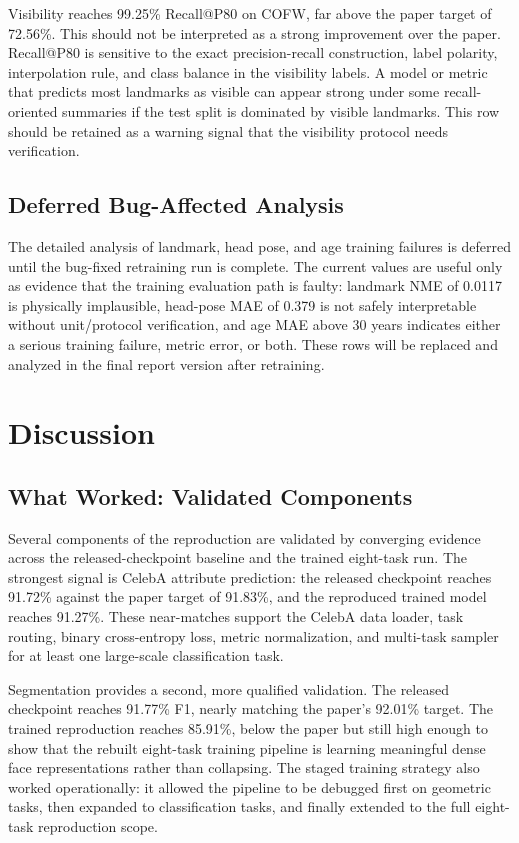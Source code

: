 \documentclass[11pt]{article}
\begin{document}
Visibility reaches 99.25\% Recall@P80 on COFW, far above the paper target of 72.56\%. This should not be interpreted as a strong improvement over the paper. Recall@P80 is sensitive to the exact precision-recall construction, label polarity, interpolation rule, and class balance in the visibility labels. A model or metric that predicts most landmarks as visible can appear strong under some recall-oriented summaries if the test split is dominated by visible landmarks. This row should be retained as a warning signal that the visibility protocol needs verification.


\subsection{Deferred Bug-Affected Analysis}


The detailed analysis of landmark, head pose, and age training failures is deferred until the bug-fixed retraining run is complete. The current values are useful only as evidence that the training evaluation path is faulty: landmark NME of 0.0117 is physically implausible, head-pose MAE of 0.379 is not safely interpretable without unit/protocol verification, and age MAE above 30 years indicates either a serious training failure, metric error, or both. These rows will be replaced and analyzed in the final report version after retraining.


\section{Discussion}


\subsection{What Worked: Validated Components}


Several components of the reproduction are validated by converging evidence across the released-checkpoint baseline and the trained eight-task run. The strongest signal is CelebA attribute prediction: the released checkpoint reaches 91.72\% against the paper target of 91.83\%, and the reproduced trained model reaches 91.27\%. These near-matches support the CelebA data loader, task routing, binary cross-entropy loss, metric normalization, and multi-task sampler for at least one large-scale classification task.


Segmentation provides a second, more qualified validation. The released checkpoint reaches 91.77\% F1, nearly matching the paper's 92.01\% target. The trained reproduction reaches 85.91\%, below the paper but still high enough to show that the rebuilt eight-task training pipeline is learning meaningful dense face representations rather than collapsing. The staged training strategy also worked operationally: it allowed the pipeline to be debugged first on geometric tasks, then expanded to classification tasks, and finally extended to the full eight-task reproduction scope.
\end{document}
